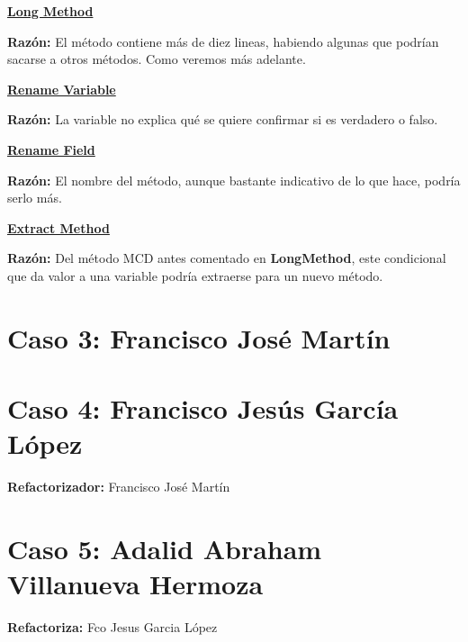 \documentclass[11pt,a4paper,oneside]{book}
\begin{document}
    
    
    \hyperref[LongMethod]{\textbf{Long Method}}
    
    \textbf{Razón:} El método contiene más de diez lineas, habiendo algunas que podrían sacarse a otros métodos. Como veremos más adelante.
    
    
    
    \hyperref[RenameVariable]{\textbf{Rename Variable}}
    
    \textbf{Razón:} La variable no explica qué se quiere confirmar si es verdadero o falso.
    
    
    
    \hyperref[RenameField]{\textbf{Rename Field}}
    
    \textbf{Razón:} El nombre del método, aunque bastante indicativo de lo que hace, podría serlo más.
    
    
    
    \hyperref[ExtractMethod]{\textbf{Extract Method}}
    
    \textbf{Razón:} Del método MCD antes comentado en \textbf{LongMethod}, este condicional que da valor a una variable podría extraerse para un nuevo método.
    
    
    
\chapter {Caso 3: Francisco José Martín}


\chapter {Caso 4: Francisco Jesús García López}
\textbf{Refactorizador:} Francisco José Martín







\chapter {Caso 5: Adalid Abraham Villanueva Hermoza}
\textbf{Refactoriza:} Fco Jesus Garcia López
\end{document}

